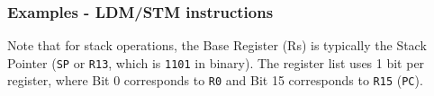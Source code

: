 \documentclass[../comorg-part1.tex]{subfiles}
\begin{document}
        
        
        

\subsubsection{Examples - LDM/STM instructions}

Note that for stack operations, the Base Register (Rs) is typically the Stack Pointer (\texttt{SP} or \texttt{R13}, which is \texttt{1101} in binary). The register list uses 1 bit per register, where Bit 0 corresponds to \texttt{R0} and Bit 15 corresponds to \texttt{R15} (\texttt{PC}).
\end{document}
